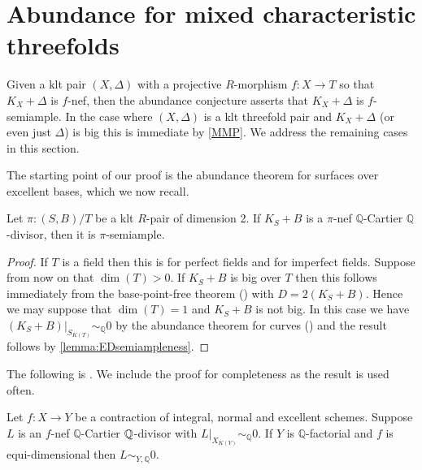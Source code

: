 	
\section{Abundance for mixed characteristic threefolds}

Given a klt pair $(X,\Delta)$ with a projective $R$-morphism $f \colon X \to T$ so that $K_{X}+\Delta$ is $f$-nef, then the abundance conjecture asserts that $K_{X}+\Delta$ is $f$-semiample. 
In the case where $(X,\Delta)$ is a klt threefold pair and $K_{X}+\Delta$ (or even just $\Delta$) is big this is immediate by \autoref{MMP}. 
We address the remaining cases in this section.

The starting point of our proof is the abundance theorem for surfaces over excellent bases, which we now recall. 

\begin{theorem}\label{abundance-dim2}
	Let $\pi \colon (S,B)/T$ be a klt $R$-pair of dimension 2.  
	If $K_{S}+B$ is a $\pi$-nef $\mathbb{Q}$-Cartier $\mathbb{Q}$-divisor, then it is $\pi$-semiample.
\end{theorem}

\begin{proof}	
	If $T$ is a field then this is \cite[Theorem 1.2]{fujino2012log} for perfect fields and \cite{tanaka2020abundance} for imperfect fields. 
	Suppose from now on that $\dim (T) > 0$.
	If $K_{S}+B$ is big over $T$ then this follows immediately from the base-point-free theorem (\cite[Theorem 4.2]{tanaka2018minimal}) with $D=2(K_{S}+B)$. Hence we may suppose that $\dim (T)=1$ and $K_{S}+B$ is not big. In this case we have $(K_{S}+B)|_{S_{K(T)}} \sim_{\mathbb{Q}} 0$ by the abundance theorem for curves (\cite[Lemma 9.22]{bhatt2020}) and the result follows by \autoref{lemma:EDsemiampleness}.
\end{proof}

The following is \cite[Lemma 2.17]{cascini2020relative}. We include the proof for completeness as the result is used often.


\begin{lemma}\label{lemma:EDsemiampleness}
	Let $f\colon X \to Y$ be a contraction of integral, normal and excellent schemes. Suppose $L$ is an $f$-nef $\mathbb{Q}$-Cartier $\mathbb{Q}$-divisor with $L|_{X_{K(Y)}} \sim_{\mathbb{Q}} 0$. If $Y$ is $\mathbb{Q}$-factorial and $f$ is equi-dimensional then $L \sim_{Y,\mathbb{Q}} 0$.
\end{lemma}

